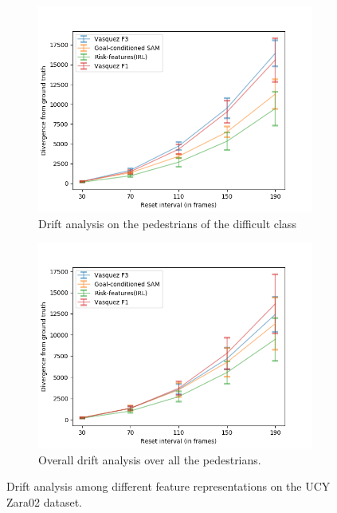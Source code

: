\begin{figure}[htbp]
\begin{subfigure}{0.5\textwidth}
	\end{subfigure}
	\begin{subfigure}{0.5\textwidth}
		\centering
		\includegraphics[width=\linewidth]{plots/zara02_inter_irl_adjusted_speed/drift_hard_inter_irl_zara02_adjusted.png}
		\caption {Drift analysis on the pedestrians of the difficult class}
		\label{fig:inter_IRL-drift_analysis_hard-zara02}
	\end{subfigure}
	\begin{subfigure}{0.5\textwidth}
		\centering
		\includegraphics[width=\linewidth]{plots/zara02_inter_irl_adjusted_speed/drift_all_inter_irl_zara02_adjusted.png}
		\caption {Overall drift analysis over all the pedestrians.}
		\label{fig:inter_IRL-drift_analysis_all-zara02}
	\end{subfigure}
	\caption{Drift analysis among different feature representations on the UCY Zara02 dataset.}
	\label{fig:drift_analysis-inter_IRL-zara02}
\end{figure}

